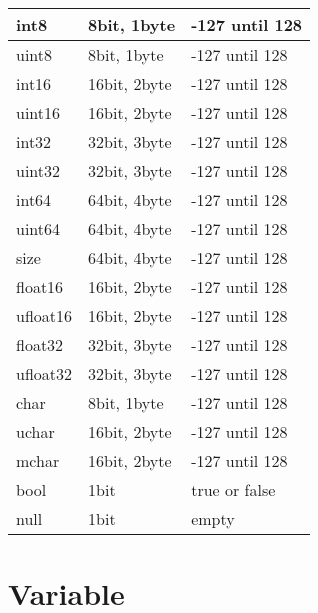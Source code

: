 \documentclass[11pt,fleqn]{book}
\begin{document}
\begin{table}[]
	\centering
	\begin{tabular}{|l|l|l|}
		\hline
		int8 & 8bit, 1byte & -127 until 128   \\ \hline
		uint8 & 8bit, 1byte & -127 until 128   \\ \hline

		int16 & 16bit, 2byte & -127 until 128   \\ \hline
		uint16 & 16bit, 2byte & -127 until 128   \\ \hline

		int32 & 32bit, 3byte & -127 until 128   \\ \hline
		uint32 & 32bit, 3byte & -127 until 128   \\ \hline

		int64 & 64bit, 4byte & -127 until 128   \\ \hline
		uint64 & 64bit, 4byte & -127 until 128   \\ \hline

		size & 64bit, 4byte & -127 until 128   \\ \hline

		float16 & 16bit, 2byte & -127 until 128   \\ \hline
		ufloat16 & 16bit, 2byte & -127 until 128   \\ \hline

		float32 & 32bit, 3byte & -127 until 128   \\ \hline
		ufloat32 & 32bit, 3byte & -127 until 128   \\ \hline

		char & 8bit, 1byte & -127 until 128   \\ \hline
		uchar & 16bit, 2byte & -127 until 128   \\ \hline

		mchar & 16bit, 2byte & -127 until 128   \\ \hline

		bool & 1bit & true or false \\ \hline
		null & 1bit & empty \\ \hline

	\end{tabular}
\end{table}
\label{List of data type(s)}







\section{Variable}
\end{document}
